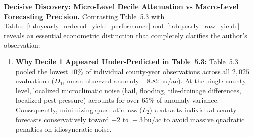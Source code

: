 \documentclass[11pt,a4paper]{article}
\begin{document}




\noindent \textbf{Decisive Discovery: Micro-Level Decile Attenuation vs Macro-Level Forecasting Precision.}
Contrasting Table~5.3 with Tables~\ref{tab:yearly_ordered_yield_performance} and~\ref{tab:yearly_raw_yields} reveals an essential econometric distinction that completely clarifies the author's observation:
\begin{enumerate}
    \item \textbf{Why Decile 1 Appeared Under-Predicted in Table~5.3:}
    Table~5.3 pooled the lowest $10\%$ of individual county-year observations across all $2{,}025$ evaluations ($D_1$, mean observed anomaly $-8.82$\,bu/ac). At the single-county level, localized microclimatic noise (hail, flooding, tile-drainage differences, localized pest pressure) accounts for over $65\%$ of anomaly variance. Consequently, minimizing quadratic loss ($L_2$) contracts individual county forecasts conservatively toward $-2\text{ to }-3$\,bu/ac to avoid massive quadratic penalties on idiosyncratic noise.
    

\end{enumerate}
\end{document}
